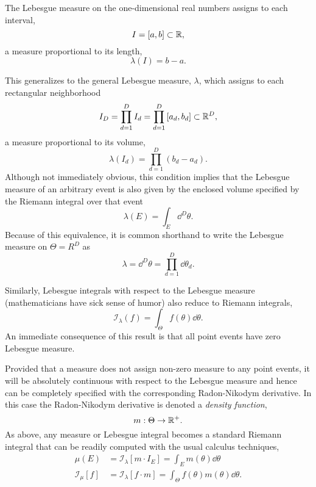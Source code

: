 The Lebesgue measure on the one-dimensional real numbers
assigns to each interval,
%
\begin{equation*}
I = \left[a, b \right] \subset \mathbb{R},
\end{equation*}
%
a measure proportional to its length,
%
\begin{equation*}
\lambda \! \left( I \right) = b - a.  
\end{equation*}

This generalizes to the general Lebesgue measure, $\lambda$, 
which assigns to each rectangular neighborhood
%
\begin{equation*}
I_{D} = \prod_{d=1}^{D} I_{d} = \prod_{d=1}^{D} \left[a_{d}, b_{d} \right]
\subset \mathbb{R}^{D},
\end{equation*}
%
a measure proportional to its volume,
%
\begin{equation*}
\lambda \! \left( I_{d} \right) = 
\prod_{d = 1}^{D} \left(b_{d} - a_{d} \right).  
\end{equation*}
%
Although not immediately obvious, this condition implies that the 
Lebesgue measure of an arbitrary event is also given by the
enclosed volume specified by the Riemann integral over that event
%
\begin{equation*}
\lambda \! \left( E \right)= \int_{E} \dd^{D} \theta.
\end{equation*}
%
Because of this equivalence, it is common shorthand to write the 
Lebesgue measure on $\Theta = R^{D}$ as 
%
\begin{equation*}
\lambda = \dd^{D} \theta = \prod_{d = 1}^{D} \dd \theta_{d}.
\end{equation*}

Similarly, Lebesgue integrals with respect to the Lebesgue measure
(mathematicians have sick sense of humor) also reduce to Riemann
integrals,
%
\begin{equation*}
\mathcal{I}_{\lambda} \! \left( f \right)
= \int_{\Theta} f \! \left( \theta \right) \dd \theta.
\end{equation*}
%
An immediate consequence of this result is that all point events
have zero Lebesgue measure.

Provided that a measure does not assign non-zero measure to any
point events, it will be absolutely continuous with respect to the
Lebesgue measure and hence can be completely specified with
the corresponding Radon-Nikodym derivative.  In this case the
Radon-Nikodym derivative is denoted a \emph{density function},
%
\begin{equation*}
m : \Theta \rightarrow \mathbb{R}^{+}.
\end{equation*}
%
As above, any measure or Lebesgue integral becomes a standard
Riemann integral that can be readily computed with the usual
calculus techniques,
%
\begin{align*}
\mu \! \left( E \right)
&=
\mathcal{I}_{\lambda} \! \left[ m \cdot I_{E} \right]
=
\int_{E} m \! \left( \theta \right) \dd \theta
\\
\mathcal{I}_{\mu} \! \left[ f \right]
&=
\mathcal{I}_{\lambda} \! \left[ f \cdot m \right]
=
\int_{\Theta} f \! \left( \theta \right) m \! \left( \theta \right) \dd \theta.
\end{align*}

